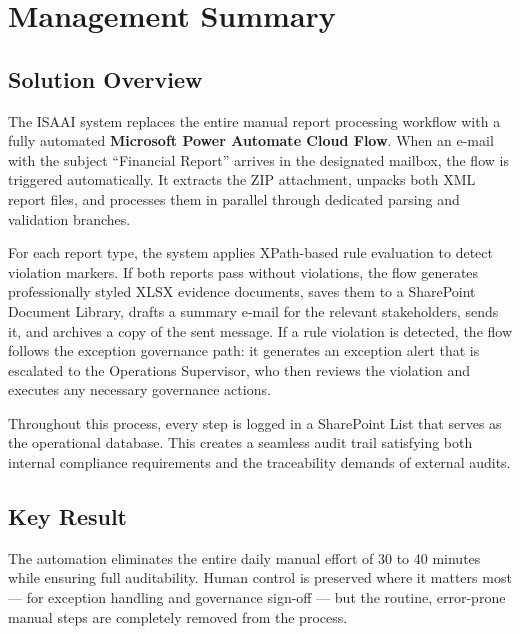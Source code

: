 \documentclass[11pt,a4paper]{article}
\begin{document}

\section{Management Summary}

\subsection{Solution Overview}

The ISAAI system replaces the entire manual report processing workflow with a fully automated \textbf{Microsoft Power Automate Cloud Flow}. When an e-mail with the subject ``Financial Report'' arrives in the designated mailbox, the flow is triggered automatically. It extracts the ZIP attachment, unpacks both XML report files, and processes them in parallel through dedicated parsing and validation branches.

For each report type, the system applies XPath-based rule evaluation to detect violation markers. If both reports pass without violations, the flow generates professionally styled XLSX evidence documents, saves them to a SharePoint Document Library, drafts a summary e-mail for the relevant stakeholders, sends it, and archives a copy of the sent message. If a rule violation is detected, the flow follows the exception governance path: it generates an exception alert that is escalated to the Operations Supervisor, who then reviews the violation and executes any necessary governance actions.

Throughout this process, every step is logged in a SharePoint List that serves as the operational database. This creates a seamless audit trail satisfying both internal compliance requirements and the traceability demands of external audits.

\subsection{Key Result}

The automation eliminates the entire daily manual effort of 30 to 40 minutes while ensuring full auditability. Human control is preserved where it matters most --- for exception handling and governance sign-off --- but the routine, error-prone manual steps are completely removed from the process.
\end{document}
